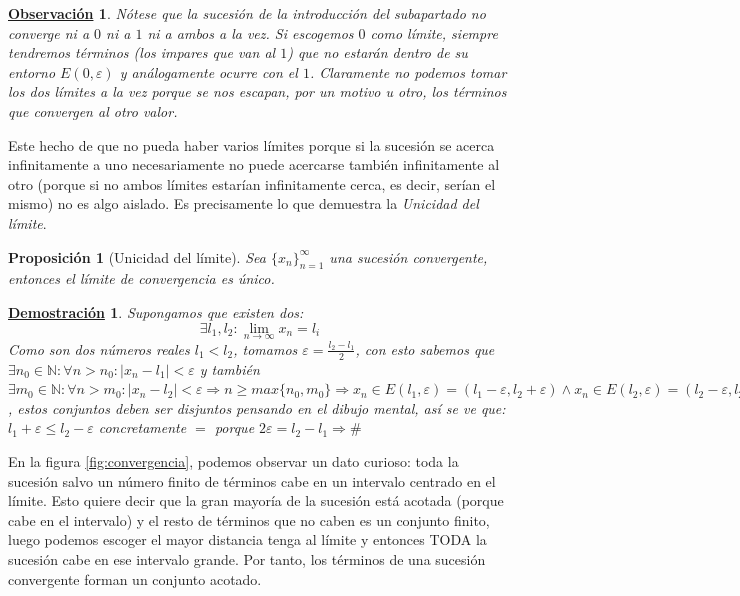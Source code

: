 \documentclass[10pt,a4paper,openright]{book}
\theoremstyle{break}
\newtheorem{prop}{Proposición}[chapter]
\newtheorem*{demo}{\underline{Demostración}}
\newtheorem{obs}{\underline{Observación}}[chapter]
\begin{document}
\begin{obs}
Nótese que la sucesión de la introducción del subapartado no converge ni a $0$ ni a $1$ ni a ambos a la vez. Si escogemos $0$ como límite, siempre tendremos términos (los impares que van al $1$) que no estarán dentro de su entorno $E(0,\varepsilon)$ y análogamente ocurre con el $1$. Claramente no podemos tomar los dos límites a la vez porque se nos escapan, por un motivo u otro, los términos que convergen al otro valor.
\end{obs}

Este hecho de que no pueda haber varios límites porque si la sucesión se acerca infinitamente a uno necesariamente no puede acercarse también infinitamente al otro (porque si no ambos límites estarían infinitamente cerca, es decir, serían el mismo) no es algo aislado. Es precisamente lo que demuestra la \textit{Unicidad del límite}.
 
\begin{prop}[Unicidad del límite]
Sea $\{x_n\}_{n=1}^\infty$ una sucesión convergente, entonces el límite de convergencia es único.
\end{prop}
\begin{demo}
Supongamos que existen dos:
$$\exists l_1,l_2: \lim_{n\rightarrow \infty}x_n=l_i$$
Como son dos números reales $l_1<l_2$, tomamos $\varepsilon=\frac{l_2-l_1}{2}$, con esto sabemos que $\exists n_0\in \mathbb N: \forall n>n_0: |x_n-l_1|<\varepsilon$ y también $\exists m_0\in \mathbb N: \forall n>m_0: |x_n-l_2|<\varepsilon\Rightarrow n\geq max\{n_0,m_0\}\Rightarrow x_n\in E(l_1,\varepsilon)=(l_1-\varepsilon, l_2+\varepsilon)\wedge x_n\in E(l_2, \varepsilon)=(l_2-\varepsilon, l_2+\varepsilon)$, estos conjuntos deben ser disjuntos pensando en el dibujo mental, así se ve que: $l_1+\varepsilon\leq l_2-\varepsilon$ concretamente $=$ porque $2\varepsilon=l_2-l_1\Rightarrow \#$
\end{demo}

En la figura \ref{fig:convergencia}, podemos observar un dato curioso: toda la sucesión salvo un número finito de términos cabe en un intervalo centrado en el límite. Esto quiere decir que la gran mayoría de la sucesión está acotada (porque cabe en el intervalo) y el resto de términos que no caben es un conjunto finito, luego podemos escoger el mayor distancia tenga al límite y entonces TODA la sucesión cabe en ese intervalo grande. Por tanto, los términos de una sucesión convergente forman un conjunto acotado.
\end{document}
